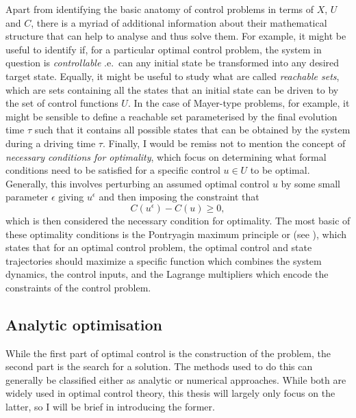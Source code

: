 Apart from identifying the basic anatomy of control problems in terms of $X$, $U$ and $C$, there is a myriad of additional information about their mathematical structure that can help to analyse and thus solve them. For example, it might be useful to identify if, for a particular optimal control problem, the system in question is \emph{controllable}\cite{dirr_lie_2008, fleming_optimal_1975} \@i.e.~can any initial state be transformed into any desired target state. Equally, it might be useful to study what are called \emph{reachable sets}\cite{vom_ende_reachability_2020, fleming_optimal_1975}, which are sets containing all the states that an initial state can be driven to by the set of control functions $U$. In the case of Mayer-type problems, for example, it might be sensible to define a reachable set parameterised by the final evolution time $\tau$ such that it contains all possible states that can be obtained by the system during a driving time $\tau$. Finally, I would be remiss not to mention the concept of \emph{necessary conditions for optimality}\cite{mangasarian_sufficient_1966}, which focus on determining what formal conditions need to be satisfied for a specific control $u \in U$ to be optimal. Generally, this involves perturbing an assumed optimal control $u$ by some small parameter $\epsilon$ giving $u^{\epsilon}$ and then imposing the constraint that
\begin{equation}\label{eq:optimality_condition}
    C(u^{\epsilon}) - C(u) \geq 0,
\end{equation}
which is then considered the necessary condition for optimality. The most basic of these optimality conditions is the Pontryagin maximum principle or  \cite{boltyanski_nonclassical_1999} (see ), which states that for an optimal control problem, the optimal control and state trajectories should maximize a specific function which combines the system dynamics, the control inputs, and the Lagrange multipliers which encode the constraints of the control problem.

\subsection{Analytic optimisation}\label{sec:3.1.2_analytic_optimisation}

While the first part of optimal control is the construction of the problem, the second part is the search for a solution. The methods used to do this can generally be classified either as analytic or numerical approaches. While both are widely used in optimal control theory, this thesis will largely only focus on the latter, so I will be brief in introducing the former. 

